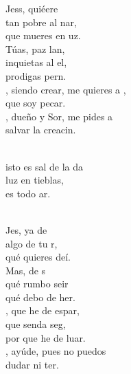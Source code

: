 \documentclass[12pt]{article}
\begin{document}
\begin{multicols*}{2}
\begin{cancion}%
	Jess, quiéere \\
	tan pobre al nar,\\
	que mueres en uz.\\
	Túas, paz  lan, \\
	inquietas al el,\\
	prodigas pern. \\
	, siendo crear, me quieres a , \\
	que soy pecar.\\
	, dueño y Sor, me pides a   \\
	salvar la creacin.\\\jump\\
	\begin{chorus}%
	isto es sal de la da\\
	luz en tieblas,\\
	es todo ar.\\
	\end{chorus}%
	\jump\\
	Jes, ya  de  \\
	algo de tu r,\\
	qué quieres deí.\\
	Mas,  de s\\
	qué rumbo seir\\
	qué debo de her.\\
	, que he de espar,\\
	que senda seg,\\
	por que he de luar.\\
	, ayúde, pues no puedos  \\
	dudar ni ter.\\
\end{cancion}%


\end{multicols*}
\end{document}
